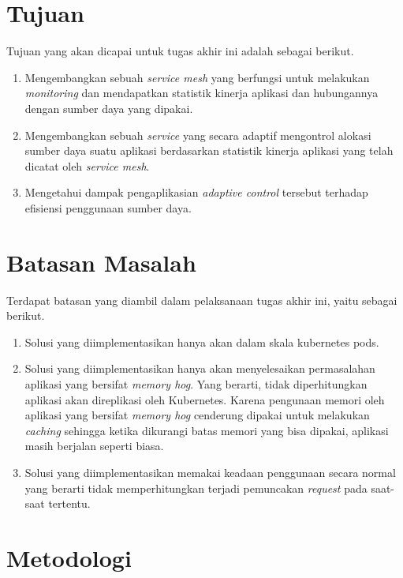 \section{Tujuan}

Tujuan yang akan dicapai untuk tugas akhir ini adalah sebagai berikut.

\begin{enumerate}
    \item Mengembangkan sebuah \textit{service mesh} yang berfungsi untuk melakukan \textit{monitoring} dan mendapatkan statistik kinerja aplikasi dan hubungannya dengan sumber daya yang dipakai.

    \item Mengembangkan sebuah \textit{service} yang secara adaptif mengontrol alokasi sumber daya suatu aplikasi berdasarkan statistik kinerja aplikasi yang telah dicatat oleh \textit{service mesh}.

    \item Mengetahui dampak pengaplikasian \textit{adaptive control} tersebut terhadap efisiensi penggunaan sumber daya.
\end{enumerate}

\section{Batasan Masalah}

Terdapat batasan yang diambil dalam pelaksanaan tugas akhir ini, yaitu sebagai berikut.

\begin{enumerate}
    \item Solusi yang diimplementasikan hanya akan dalam skala kubernetes pods.
    \item Solusi yang diimplementasikan hanya akan menyelesaikan permasalahan aplikasi yang bersifat \textit{memory hog}. Yang berarti, tidak diperhitungkan aplikasi akan direplikasi oleh Kubernetes. Karena pengunaan memori oleh aplikasi yang bersifat \textit{memory hog} cenderung dipakai untuk melakukan \textit{caching} sehingga ketika dikurangi batas memori yang bisa dipakai, aplikasi masih berjalan seperti biasa.
    \item Solusi yang diimplementasikan memakai keadaan penggunaan secara normal yang berarti tidak memperhitungkan terjadi pemuncakan \textit{request} pada saat-saat tertentu.
\end{enumerate}

\section{Metodologi}

